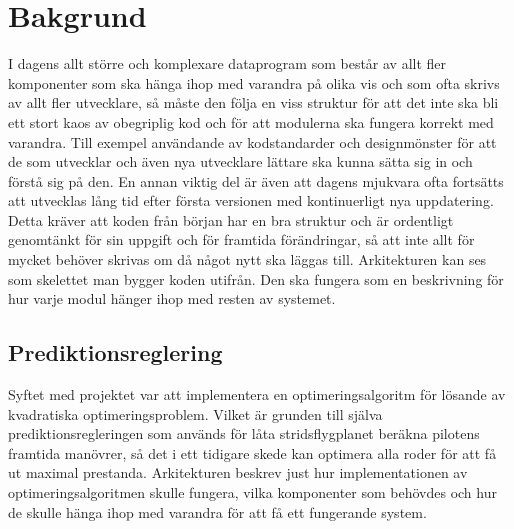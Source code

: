 \section{Bakgrund}
I dagens allt större och komplexare dataprogram som består av allt fler komponenter som ska hänga ihop med varandra på olika vis och som ofta skrivs av allt fler utvecklare, så måste den följa en viss struktur för att det inte ska bli ett stort kaos av obegriplig kod och för att modulerna ska fungera korrekt med varandra. Till exempel användande av kodstandarder och designmönster för att de som utvecklar och även nya utvecklare lättare ska kunna sätta sig in och förstå sig på den.
\newline
\newline
En annan viktig del är även att dagens mjukvara ofta fortsätts att utvecklas lång tid efter första versionen med kontinuerligt nya uppdatering. Detta kräver att koden från början har en bra struktur och är ordentligt genomtänkt för sin uppgift och för framtida förändringar, så att inte allt för mycket behöver skrivas om då något nytt ska läggas till.
\newline
\newline
Arkitekturen kan ses som skelettet man bygger koden utifrån. Den ska fungera som en beskrivning för hur varje modul hänger ihop med resten av systemet.

\subsection{Prediktionsreglering}
Syftet med projektet var att implementera en optimeringsalgoritm för lösande av kvadratiska optimeringsproblem. Vilket är grunden till själva prediktionsregleringen som används för låta stridsflygplanet beräkna pilotens framtida manövrer, så det i ett tidigare skede kan optimera alla roder för att få ut maximal prestanda.
\newline
\newline
Arkitekturen beskrev just hur implementationen av optimeringsalgoritmen skulle fungera, vilka komponenter som behövdes och hur de skulle hänga ihop med varandra för att få ett fungerande system.

